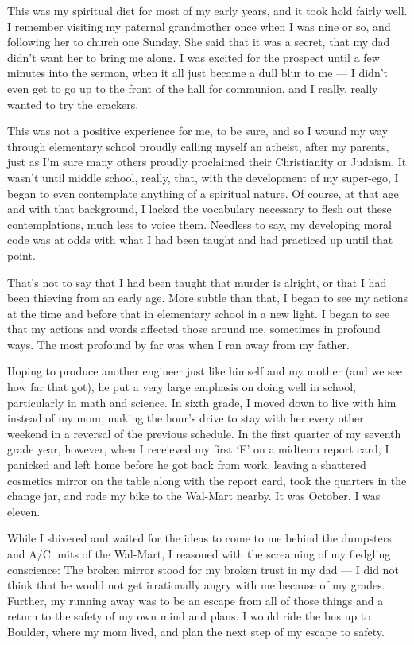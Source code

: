 \documentclass{book}
\begin{document}
This was my spiritual diet for most of my early years, and it took hold fairly well.  I remember visiting my paternal grandmother once when I was nine or so, and following her to church one Sunday.  She said that it was a secret, that my dad didn't want her to bring me along.  I was excited for the prospect until a few minutes into the sermon, when it all just became a dull blur to me --- I didn't even get to go up to the front of the hall for communion, and I really, really wanted to try the crackers.

This was not a positive experience for me, to be sure, and so I wound my way through elementary school proudly calling myself an atheist, after my parents, just as I'm sure many others proudly proclaimed their Christianity or Judaism.  It wasn't until middle school, really, that, with the development of my super-ego, I began to even contemplate anything of a spiritual nature.  Of course, at that age and with that background, I lacked the vocabulary necessary to flesh out these contemplations, much less to voice them.  Needless to say, my developing moral code was at odds with what I had been taught and had practiced up until that point.

That's not to say that I had been taught that murder is alright, or that I had been thieving from an early age.  More subtle than that, I began to see my actions at the time and before that in elementary school in a new light.  I began to see that my actions and words affected those around me, sometimes in profound ways.  The most profound by far was when I ran away from my father.

Hoping to produce another engineer just like himself and my mother (and we see how far that got), he put a very large emphasis on doing well in school, particularly in math and science.  In sixth grade, I moved down to live with him instead of my mom, making the hour's drive to stay with her every other weekend in a reversal of the previous schedule.  In the first quarter of my seventh grade year, however, when I receieved my first `F' on a midterm report card, I panicked and left home before he got back from work, leaving a shattered cosmetics mirror on the table along with the report card, took the quarters in the change jar, and rode my bike to the Wal-Mart nearby.  It was October.  I was eleven.

While I shivered and waited for the ideas to come to me behind the dumpsters and A/C units of the Wal-Mart, I reasoned with the screaming of my fledgling conscience: The broken mirror stood for my broken trust in my dad --- I did not think that he would not get irrationally angry with me because of my grades.  Further, my running away was to be an escape from all of those things and a return to the safety of my own mind and plans.  I would ride the bus up to Boulder, where my mom lived, and plan the next step of my escape to safety.
\end{document}
